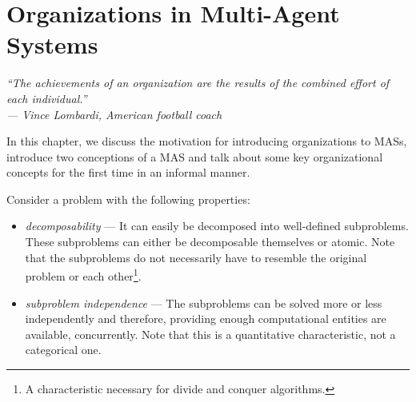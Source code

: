 
\chapter{Organizations in Multi-Agent Systems}

\begin{flushright}
\textit{``The achievements of an organization are the results of the combined effort of each individual.''}\\
\textit{--- Vince Lombardi, American football coach}
\end{flushright}

In this chapter, we discuss the motivation for introducing organizations to MASs, introduce two conceptions of a MAS and talk about some key organizational concepts for the first time in an informal manner.

Consider a problem with the following properties:
\begin{itemize} %
	\item \textit{decomposability} --- It can easily be decomposed into well-defined subproblems. These subproblems can either be decomposable themselves or atomic.
	Note that the subproblems do not necessarily have to resemble the original problem or each other\footnote{A characteristic necessary for divide and conquer algorithms.}.
	\item \textit{subproblem independence} --- The subproblems can be solved more or less independently and therefore, providing enough computational entities are available, concurrently.
	Note that this is a quantitative characteristic, not a categorical one.
\end{itemize}

